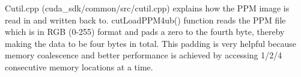 \label{ch:performance}
Cutil.cpp (cuda_sdk/common/src/cutil.cpp) explains how the PPM image is read in
and written back to. cutLoadPPM4ub() function reads the PPM file which is in RGB
(0-255) format and pads a zero to the fourth byte, thereby making the data to be
four bytes in total. This padding is very helpful because memory coalescence and
better performance is achieved by accessing 1/2/4 consecutive memory locations
at a time.

